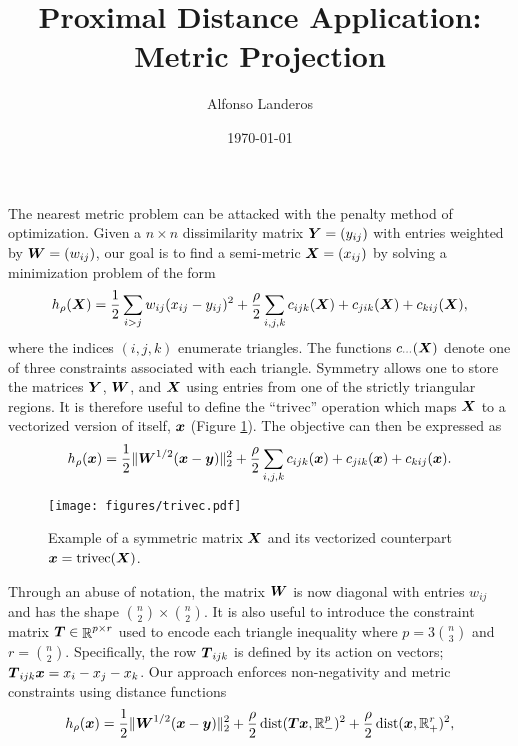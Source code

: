 \documentclass{article}
\title{Proximal Distance Application: Metric Projection}
\author{Alfonso Landeros}
\date{\today}
\begin{document}
\maketitle

The nearest metric problem \cite{sra2005} can be attacked with the penalty method of optimization.
Given a \(n \times n\) dissimilarity matrix \(\boldsymbol{Y} = (y_{ij})\) with entries weighted by \(\boldsymbol{W} = (w_{ij})\), our goal is to find a semi-metric \(\boldsymbol{X} = (x_{ij})\) by solving a minimization problem of the form
\begin{equation*}
    h_{\rho}(\boldsymbol{X})
    =
    \frac{1}{2} \sum_{i>j} w_{ij}(x_{ij} - y_{ij})^{2}
    +
    \frac{\rho}{2} \sum_{i,j,k} c_{ijk}(\boldsymbol{X}) + c_{jik}(\boldsymbol{X}) + c_{kij}(\boldsymbol{X}),
\end{equation*}
where the indices \((i,j,k)\) enumerate triangles.
The functions \(c_{\cdot \cdot \cdot}(\boldsymbol{X})\) denote one of three constraints associated with each triangle.
Symmetry allows one to store the matrices \(\boldsymbol{Y}\), \(\boldsymbol{W}\), and \(\boldsymbol{X}\) using entries from one of the strictly triangular regions.
It is therefore useful to define the ``\(\mathrm{trivec}\)'' operation which maps \(\boldsymbol{X}\) to a vectorized version of itself, \(\boldsymbol{x}\) (Figure \ref{fig:trivec-operation}).
The objective can then be expressed as
\begin{equation*}
  h_{\rho}(\boldsymbol{x})
  =
  \frac{1}{2} \lVert{\boldsymbol{W}^{1/2}(\boldsymbol{x}- \boldsymbol{y})}\rVert^{2}_{2}
  +
  \frac{\rho}{2} \sum_{i,j,k} c_{ijk}(\boldsymbol{x}) + c_{jik}(\boldsymbol{x}) + c_{kij}(\boldsymbol{x}).
\end{equation*}
\begin{figure}[!htbp]
    \centering
    \texttt{[image: figures/trivec.pdf]}
    \caption{
      Example of a symmetric matrix \(\boldsymbol{X}\) and its vectorized counterpart \(\boldsymbol{x} = \mathrm{trivec}(\boldsymbol{X})\).
    }
    \label{fig:trivec-operation}
  \end{figure}
Through an abuse of notation, the matrix \(\boldsymbol{W}\) is now diagonal with entries \(w_{ij}\) and has the shape \(\binom{n}{2} \times \binom{n}{2}\).
It is also useful to introduce the constraint matrix \(\boldsymbol{T} \in \mathop{\mathbb{R}}\nolimits^{p \times r}\) used to encode each triangle inequality where \(p = 3 \binom{n}{3}\) and \(r = \binom{n}{2}\).
Specifically, the row \(\boldsymbol{T}_{ijk}\) is defined by its action on vectors;  \(\boldsymbol{T}_{ijk} \boldsymbol{x} = x_{i} - x_{j} - x_{k}\).
Our approach enforces non-negativity and metric constraints using distance functions
\begin{equation}
  \label{eq:objective}
  h_{\rho}(\boldsymbol{x})
  =
  \frac{1}{2} \lVert{\boldsymbol{W}^{1/2} (\boldsymbol{x}- \boldsymbol{y})}\rVert^{2}_{2}
    +
  \frac{\rho}{2} \mathop{\rm dist}\nolimits(\boldsymbol{T} \boldsymbol{x}, \mathbb{R}_{-}^{p})^{2}
    +
  \frac{\rho}{2} \mathop{\rm dist}\nolimits(\boldsymbol{x}, \mathbb{R}_{+}^{r})^{2},
\end{equation}
\end{document}
